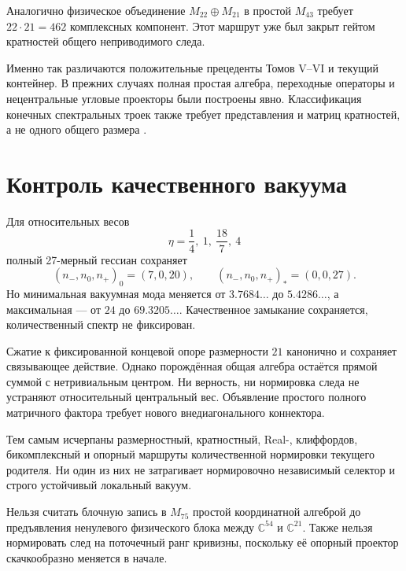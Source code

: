 Аналогично физическое объединение $M_{22}\oplus M_{21}$ в простой
$M_{43}$ требует $22\cdot21=462$ комплексных компонент. Этот маршрут уже
был закрыт гейтом кратностей общего неприводимого следа.

Именно так различаются положительные прецеденты Томов V--VI и текущий
контейнер. В прежних случаях полная простая алгебра, переходные операторы и
нецентральные угловые проекторы были построены явно. Классификация конечных
спектральных троек также требует представления и матриц кратностей, а не
одного общего размера \cite{v7-support-krajewski,v7-support-cacic,
v7-support-masson}.

\section{Контроль качественного вакуума}

Для относительных весов
\begin{equation}
 \eta=\frac14,\ 1,\ \frac{18}{7},\ 4
\end{equation}
полный 27-мерный гессиан сохраняет
\begin{equation}
 (n_-,n_0,n_+)_{0}=(7,0,20),
 \qquad
 (n_-,n_0,n_+)_{*}=(0,0,27).
\end{equation}
Но минимальная вакуумная мода меняется от $3.7684\ldots$ до
$5.4286\ldots$, а максимальная --- от $24$ до $69.3205\ldots$.
Качественное замыкание сохраняется, количественный спектр не фиксирован.

\begin{theorem}
Сжатие к фиксированной концевой опоре размерности $21$ канонично и
сохраняет связывающее действие. Однако порождённая общая алгебра остаётся
прямой суммой с нетривиальным центром. Ни верность, ни нормировка следа не
устраняют относительный центральный вес. Объявление простого полного
матричного фактора требует нового внедиагонального коннектора.
\end{theorem}

\begin{remark}
Тем самым исчерпаны размерностный, кратностный, Real-, клиффордов,
бикомплексный и опорный маршруты количественной нормировки текущего
родителя. Ни один из них не затрагивает нормировочно независимый селектор и
строго устойчивый локальный вакуум.
\end{remark}

\begin{nogocriterion}
Нельзя считать блочную запись в $M_{75}$ простой координатной алгеброй до
предъявления ненулевого физического блока между $\mathbb C^{54}$ и
$\mathbb C^{21}$. Также нельзя нормировать след на поточечный ранг
кривизны, поскольку её опорный проектор скачкообразно меняется в начале.
\end{nogocriterion}

